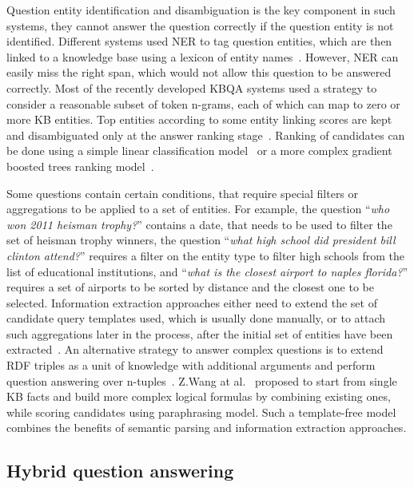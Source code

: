 Question entity identification and disambiguation is the key component in such systems, they cannot answer the question correctly if the question entity is not identified.
Different systems used NER to tag question entities, which are then linked to a knowledge base using a lexicon of entity names~\cite{BerantCFL13:sempre,BerantL14:parasempre,xu2014answering}.
However, NER can easily miss the right span, which would not allow this question to be answered correctly.
Most of the recently developed KBQA systems used a strategy to consider a reasonable subset of token n-grams, each of which can map to zero or more KB entities.
Top entities according to some entity linking scores are kept and disambiguated only at the answer ranking stage~\cite{yao-scratch-qa-naacl2015,bastmore:cikm:2015:aquu,yih:ACL:2015:STAGG}.
Ranking of candidates can be done using a simple linear classification model~\cite{yao-scratch-qa-naacl2015} or a more complex gradient boosted trees ranking model~\cite{bastmore:cikm:2015:aquu,yih:ACL:2015:STAGG}.

Some questions contain certain conditions, that require special filters or aggregations to be applied to a set of entities. 
For example, the question ``\textit{who won 2011 heisman trophy?}'' contains a date, that needs to be used to filter the set of heisman trophy winners, the question ``\textit{what high school did president bill clinton attend?}'' requires a filter on the entity type to filter high schools from the list of educational institutions, and ``\textit{what is the closest airport to naples florida?}'' requires a set of airports to be sorted by distance and the closest one to be selected.
Information extraction approaches either need to extend the set of candidate query templates used, which is usually done manually, or to attach such aggregations later in the process, after the initial set of entities have been extracted~\cite{yih:ACL:2015:STAGG,xu2016enhancing}.
An alternative strategy to answer complex questions is to extend RDF triples as a unit of knowledge with additional arguments and perform question answering over n-tuples~\cite{yin2015answering}.
Z.Wang at al.~\cite{wang2015large} proposed to start from single KB facts and build more complex logical formulas by combining existing ones, while scoring candidates using paraphrasing model.
Such a template-free model combines the benefits of semantic parsing and information extraction approaches.

\subsection{Hybrid question answering}
\label{section:relatedwork:factoid:hybrid}

